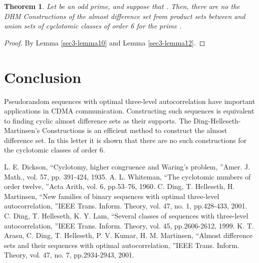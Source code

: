 \documentclass[letter]{ieice}
\newtheorem{sec3_thm1}{Theorem}\newtheorem{sec3_thm2}[sec3_thm1]{Theorem}
\begin{document}
\begin{sec3_thm1}\label{sec3-theorem1}
Let  be an odd prime, and suppose that . Then, there are no the DHM Constructions of the almost difference set from product sets between  and union sets of cyclotomic classes of order 6 for the prime .
\end{sec3_thm1}
\begin{proof}
By Lemma \ref{sec3-lemma10} and Lemma \ref{sec3-lemma12}.
\end{proof}

\section{Conclusion}\label{sec 4}
Pseudorandom sequences with optimal three-level autocorrelation have important applications in CDMA communication. Constructing such sequences is equivalent to finding cyclic almost difference sets as their supports. The Ding-Helleseth-Martinsen’s Constructions is an efficient method to construct the almost difference set. In this letter it is shown that there are no such constructions for the cyclotomic classes of order 6.
\begin{thebibliography}{99}
L. E. Dickson, \textquotedblleft Cyclotomy, higher congruence and Waring's problem, \textquotedblright  Amer. J. Math., vol. 57, pp. 391-424, 1935.
A. L. Whiteman,  \textquotedblleft The cyclotomic numbers of order twelve, \textquotedblright  Acta Arith, vol. 6, pp.53–76, 1960.
C. Ding, T. Helleseth, H. Martinsen,  \textquotedblleft New families of binary sequences with optimal three-level autocorrelation, \textquotedblright IEEE Trans. Inform. Theory, vol. 47, no. 1, pp.428-433, 2001.
C. Ding, T. Helleseth, K. Y. Lam,  \textquotedblleft Several classes of sequences with three-level autocorrelation, \textquotedblright IEEE Trans. Inform. Theory, vol. 45, pp.2606-2612, 1999.
K. T. Arasu, C. Ding, T. Helleseth,  P. V. Kumar,   H. M. Martinsen, \textquotedblleft Almost difference sets and their sequences with optimal autocorrelation, \textquotedblright IEEE Trans. Inform. Theory, vol. 47, no. 7, pp.2934-2943, 2001.
\end{thebibliography}
\end{document}
